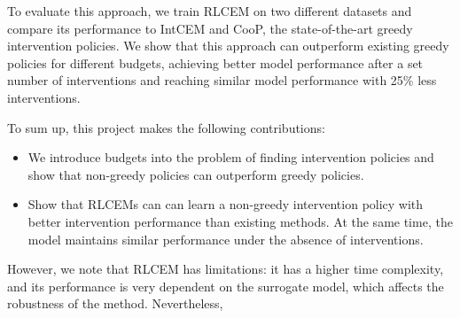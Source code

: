 To evaluate this approach, we train RLCEM on two different datasets
and compare its performance to IntCEM and CooP,
the state-of-the-art greedy intervention policies.
We show that this approach can outperform existing greedy policies
for different budgets, achieving better model performance
after a set number of interventions and reaching similar
model performance with 25\% less interventions. 


To sum up, this project makes the following contributions:
\begin{itemize}
    \item We introduce budgets into the problem
    of finding intervention policies and show that non-greedy policies can outperform greedy policies.
    \item Show that RLCEMs can
    can learn a non-greedy intervention policy
    with better intervention performance than existing methods. At the same time, the model maintains similar performance under 
the absence of interventions. 
\end{itemize}

However, we note that
RLCEM has limitations: it has a 
higher time complexity, and its performance is very dependent on the surrogate model, which 
affects the robustness of the method. Nevertheless,





